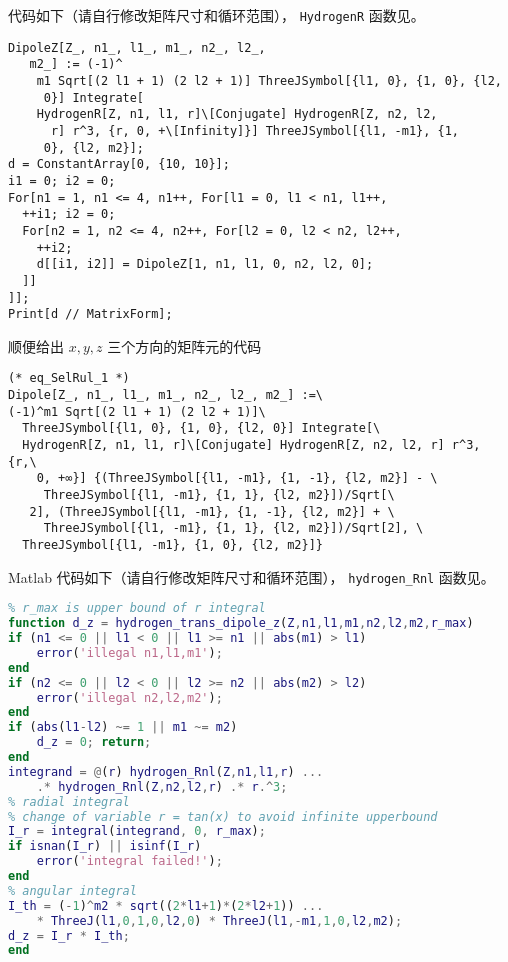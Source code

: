  代码如下（请自行修改矩阵尺寸和循环范围）， \verb|HydrogenR| 函数见。
\begin{lstlisting}[language=mma,caption=DipoleZ.m]
DipoleZ[Z_, n1_, l1_, m1_, n2_, l2_, 
   m2_] := (-1)^
    m1 Sqrt[(2 l1 + 1) (2 l2 + 1)] ThreeJSymbol[{l1, 0}, {1, 0}, {l2, 
     0}] Integrate[
    HydrogenR[Z, n1, l1, r]\[Conjugate] HydrogenR[Z, n2, l2, 
      r] r^3, {r, 0, +\[Infinity]}] ThreeJSymbol[{l1, -m1}, {1, 
     0}, {l2, m2}];
d = ConstantArray[0, {10, 10}];
i1 = 0; i2 = 0;
For[n1 = 1, n1 <= 4, n1++, For[l1 = 0, l1 < n1, l1++,
  ++i1; i2 = 0;
  For[n2 = 1, n2 <= 4, n2++, For[l2 = 0, l2 < n2, l2++,
    ++i2;
    d[[i1, i2]] = DipoleZ[1, n1, l1, 0, n2, l2, 0];
  ]]
]];
Print[d // MatrixForm];
\end{lstlisting}
顺便给出 $x,y,z$ 三个方向的矩阵元的代码
\begin{lstlisting}[language=mma, caption=Dipole.m]
(* eq_SelRul_1 *)
Dipole[Z_, n1_, l1_, m1_, n2_, l2_, m2_] :=\
(-1)^m1 Sqrt[(2 l1 + 1) (2 l2 + 1)]\
  ThreeJSymbol[{l1, 0}, {1, 0}, {l2, 0}] Integrate[\
  HydrogenR[Z, n1, l1, r]\[Conjugate] HydrogenR[Z, n2, l2, r] r^3, {r,\
    0, +∞}] {(ThreeJSymbol[{l1, -m1}, {1, -1}, {l2, m2}] - \
     ThreeJSymbol[{l1, -m1}, {1, 1}, {l2, m2}])/Sqrt[\
   2], (ThreeJSymbol[{l1, -m1}, {1, -1}, {l2, m2}] + \
     ThreeJSymbol[{l1, -m1}, {1, 1}, {l2, m2}])/Sqrt[2], \
  ThreeJSymbol[{l1, -m1}, {1, 0}, {l2, m2}]}
\end{lstlisting}

Matlab 代码如下（请自行修改矩阵尺寸和循环范围）， \verb`hydrogen_Rnl` 函数见。
\begin{lstlisting}[language=matlab,caption=hydrogen\_dipole\_z.m]
% hydrogen <n1,l1,m1|z|n2,l2,m2>
% r_max is upper bound of r integral
function d_z = hydrogen_trans_dipole_z(Z,n1,l1,m1,n2,l2,m2,r_max)
if (n1 <= 0 || l1 < 0 || l1 >= n1 || abs(m1) > l1)
    error('illegal n1,l1,m1');
end
if (n2 <= 0 || l2 < 0 || l2 >= n2 || abs(m2) > l2)
    error('illegal n2,l2,m2');
end
if (abs(l1-l2) ~= 1 || m1 ~= m2)
    d_z = 0; return;
end
integrand = @(r) hydrogen_Rnl(Z,n1,l1,r) ...
    .* hydrogen_Rnl(Z,n2,l2,r) .* r.^3;
% radial integral
% change of variable r = tan(x) to avoid infinite upperbound
I_r = integral(integrand, 0, r_max);
if isnan(I_r) || isinf(I_r)
    error('integral failed!');
end
% angular integral
I_th = (-1)^m2 * sqrt((2*l1+1)*(2*l2+1)) ...
    * ThreeJ(l1,0,1,0,l2,0) * ThreeJ(l1,-m1,1,0,l2,m2);
d_z = I_r * I_th;
end
\end{lstlisting}

